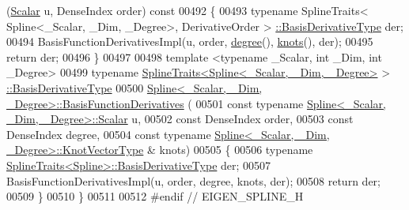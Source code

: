 \begin{DoxyCode}
      (\hyperlink{group___splines___module_a8cafd78b564825c76fbb3419653d9742}{Scalar} u, DenseIndex order)\textcolor{keyword}{ const}
00492 \textcolor{keyword}{  }\{
00493     \textcolor{keyword}{typename} SplineTraits< Spline<\_Scalar, \_Dim, \_Degree>, DerivativeOrder >
      \hyperlink{group___splines___module_a9db0b0108353660cd03524f2e67d6b3c}{::BasisDerivativeType} der;
00494     BasisFunctionDerivativesImpl(u, order, \hyperlink{group___splines___module_a0df23e941ac0f31dcd095a4dd4f4a7ec}{degree}(), \hyperlink{group___splines___module_ae3eac8af580ad880d8ad3a259d453aa1}{knots}(), der);
00495     \textcolor{keywordflow}{return} der;
00496   \}
00497 
00498   \textcolor{keyword}{template} <\textcolor{keyword}{typename} \_Scalar, \textcolor{keywordtype}{int} \_Dim, \textcolor{keywordtype}{int} \_Degree>
00499   \textcolor{keyword}{typename} \hyperlink{struct_eigen_1_1_spline_traits}{SplineTraits<Spline<\_Scalar, \_Dim, \_Degree>} >
      \hyperlink{group___splines___module_a9db0b0108353660cd03524f2e67d6b3c}{::BasisDerivativeType}
00500   \hyperlink{group___splines___module_a2e42e79b08b560007062b8f56689ae24}{Spline<\_Scalar, \_Dim, \_Degree>::BasisFunctionDerivatives}
      (
00501     \textcolor{keyword}{const} \textcolor{keyword}{typename} \hyperlink{group___splines___module_a8cafd78b564825c76fbb3419653d9742}{Spline<\_Scalar, \_Dim, \_Degree>::Scalar} u,
00502     \textcolor{keyword}{const} DenseIndex order,
00503     \textcolor{keyword}{const} DenseIndex degree,
00504     \textcolor{keyword}{const} \textcolor{keyword}{typename} \hyperlink{group___splines___module_a066f7a8b120316c9068b559f0790e9ec}{Spline<\_Scalar, \_Dim, \_Degree>::KnotVectorType}
      & knots)
00505   \{
00506     \textcolor{keyword}{typename} \hyperlink{struct_eigen_1_1_spline_traits}{SplineTraits<Spline>::BasisDerivativeType} der;
00507     BasisFunctionDerivativesImpl(u, order, degree, knots, der);
00508     \textcolor{keywordflow}{return} der;
00509   \}
00510 \}
00511 
00512 \textcolor{preprocessor}{#endif // EIGEN\_SPLINE\_H}
\end{DoxyCode}
